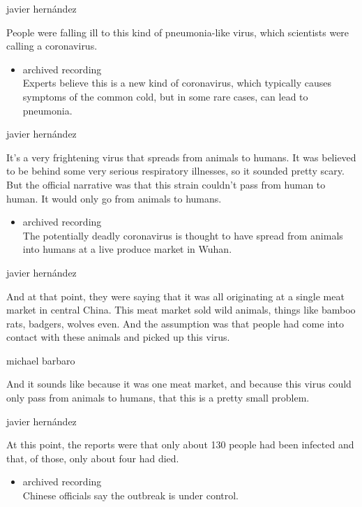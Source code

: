 javier hernández

People were falling ill to this kind of pneumonia-like virus, which
scientists were calling a coronavirus.

\begin{itemize}
\tightlist
\item
  archived recording\\
  Experts believe this is a new kind of coronavirus, which typically
  causes symptoms of the common cold, but in some rare cases, can lead
  to pneumonia.
\end{itemize}

javier hernández

It's a very frightening virus that spreads from animals to humans. It
was believed to be behind some very serious respiratory illnesses, so it
sounded pretty scary. But the official narrative was that this strain
couldn't pass from human to human. It would only go from animals to
humans.

\begin{itemize}
\tightlist
\item
  archived recording\\
  The potentially deadly coronavirus is thought to have spread from
  animals into humans at a live produce market in Wuhan.
\end{itemize}

javier hernández

And at that point, they were saying that it was all originating at a
single meat market in central China. This meat market sold wild animals,
things like bamboo rats, badgers, wolves even. And the assumption was
that people had come into contact with these animals and picked up this
virus.

michael barbaro

And it sounds like because it was one meat market, and because this
virus could only pass from animals to humans, that this is a pretty
small problem.

javier hernández

At this point, the reports were that only about 130 people had been
infected and that, of those, only about four had died.

\begin{itemize}
\tightlist
\item
  archived recording\\
  Chinese officials say the outbreak is under control.
\end{itemize}

